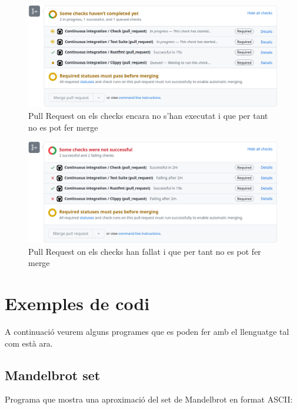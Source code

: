 ﻿\documentclass{article}
\begin{document}
\begin{figure}[!htb]
    \includegraphics[width=\linewidth]{ci-pr-inprogress.png}
    \centering
    \captionsetup{justification=centering}
    \caption{Pull Request on els checks encara no s'han executat i que per tant no es pot fer merge}
\end{figure}

\begin{figure}[!htb]
    \includegraphics[width=\linewidth]{ci-pr-fail.png}
    \centering
    \captionsetup{justification=centering}
    \caption{Pull Request on els checks han fallat i que per tant no es pot fer merge}
\end{figure}

\section{Exemples de codi}
A continuació veurem alguns programes que es poden fer amb el llenguatge tal com
està ara.

\subsection{Mandelbrot set}
Programa que mostra una aproximació del set de Mandelbrot en format ASCII:
\end{document}
